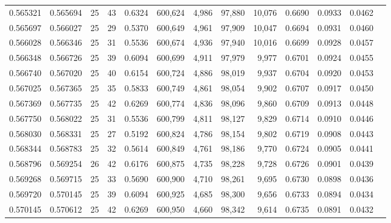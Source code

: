 \begin{tabular}{rrrrrrrrrrrrr}
0.565321 & 0.565694 &    25 &  43 &                                     0.6324 & 600,624 &   4,986 &  97,880 &  10,076 & 0.6690 & 0.0933 & 0.0462 \\
0.565697 & 0.566027 &    25 &  29 &                                     0.5370 & 600,649 &   4,961 &  97,909 &  10,047 & 0.6694 & 0.0931 & 0.0460 \\
0.566028 & 0.566346 &    25 &  31 &                                     0.5536 & 600,674 &   4,936 &  97,940 &  10,016 & 0.6699 & 0.0928 & 0.0457 \\
0.566348 & 0.566726 &    25 &  39 &                                     0.6094 & 600,699 &   4,911 &  97,979 &   9,977 & 0.6701 & 0.0924 & 0.0455 \\
0.566740 & 0.567020 &    25 &  40 &                                     0.6154 & 600,724 &   4,886 &  98,019 &   9,937 & 0.6704 & 0.0920 & 0.0453 \\
0.567025 & 0.567365 &    25 &  35 &                                     0.5833 & 600,749 &   4,861 &  98,054 &   9,902 & 0.6707 & 0.0917 & 0.0450 \\
0.567369 & 0.567735 &    25 &  42 &                                     0.6269 & 600,774 &   4,836 &  98,096 &   9,860 & 0.6709 & 0.0913 & 0.0448 \\
0.567750 & 0.568022 &    25 &  31 &                                     0.5536 & 600,799 &   4,811 &  98,127 &   9,829 & 0.6714 & 0.0910 & 0.0446 \\
0.568030 & 0.568331 &    25 &  27 &                                     0.5192 & 600,824 &   4,786 &  98,154 &   9,802 & 0.6719 & 0.0908 & 0.0443 \\
0.568344 & 0.568783 &    25 &  32 &                                     0.5614 & 600,849 &   4,761 &  98,186 &   9,770 & 0.6724 & 0.0905 & 0.0441 \\
0.568796 & 0.569254 &    26 &  42 &                                     0.6176 & 600,875 &   4,735 &  98,228 &   9,728 & 0.6726 & 0.0901 & 0.0439 \\
0.569268 & 0.569715 &    25 &  33 &                                     0.5690 & 600,900 &   4,710 &  98,261 &   9,695 & 0.6730 & 0.0898 & 0.0436 \\
0.569720 & 0.570145 &    25 &  39 &                                     0.6094 & 600,925 &   4,685 &  98,300 &   9,656 & 0.6733 & 0.0894 & 0.0434 \\
0.570145 & 0.570612 &    25 &  42 &                                     0.6269 & 600,950 &   4,660 &  98,342 &   9,614 & 0.6735 & 0.0891 & 0.0432 \\

\end{tabular}
